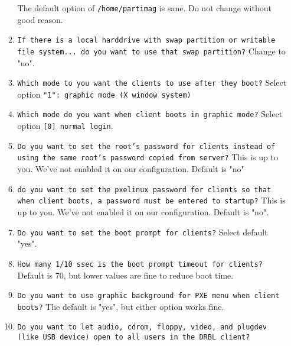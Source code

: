 \documentclass{article}
\def\code#1{\texttt{#1}}
\begin{document}
\begin{flushleft}
\begin{enumerate}
\begin{enumerate}
    The default option of \code{/home/partimag} is sane.  Do not change without good reason.
    \item \code{If there is a local harddrive with swap partition or writable file system... do you want to use that swap partition?}\linebreak\linebreak
    Change to "no".
    \item \code{Which mode to you want the clients to use after they boot?}\linebreak\linebreak
    Select option \code{"1": graphic mode (X window system)}
    \item \code{Which mode do you want when client boots in graphic mode?}\linebreak\linebreak
    Select option \code{[0] normal login}.
    \item \code{Do you want to set the root's password for clients instead of using the same root's password copied from server?}\linebreak\linebreak
    This is up to you.  We've not enabled it on our configuration.  Default is "no"
    \item \code{do you want to set the pxelinux password for clients so that when client boots, a password must be entered to startup?}\linebreak\linebreak
    This is up to you.  We've not enabled it on our configuration.  Default is "no".
    \item \code{Do you want to set the boot prompt for clients?}\linebreak\linebreak
    Select default "yes".
    \item \code{How many 1/10 ssec is the boot prompt timeout for clients?}\linebreak\linebreak
    Default is 70, but lower values are fine to reduce boot time.
    \item \code{Do you want to use graphic background for PXE menu when client boots?}\linebreak\linebreak
    The default is "yes", but either option works fine.
    \item \code{Do you want to let audio, cdrom, floppy, video, and plugdev (like USB device) open to all users in the DRBL client?}\linebreak\linebreak

\end{enumerate}
\end{enumerate}
\end{flushleft}
\end{document}
